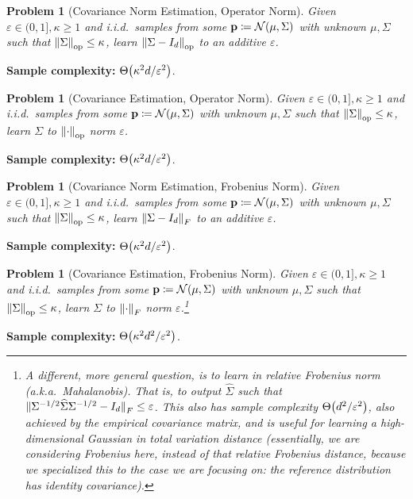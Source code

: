 \documentclass[10pt]{article}
\newcommand{\dst}{\varepsilon}
\newcommand{\dims}{d}
\newcommand{\p}{\mathbf{p}}
\renewcommand{\eqdef}{\coloneqq}
\theoremstyle{plain}
\newtheorem{problem}[theorem]{Problem}
\begin{document}
\begin{problem}[Covariance Norm Estimation, Operator Norm]
  \label{problem:cov:learn:norm:op}
  Given $\dst \in(0,1], \kappa\geq 1$ and i.i.d.\ samples from some $\p\eqdef\gaussian{\mu}{\Sigma}$ with unknown $\mu,\Sigma$ such that $\lVert\Sigma{\rVert}_{\rm op}\leq \kappa$, learn $\norm{\Sigma - I_\dims}_{\rm op}$ to an additive $\dst$.
\end{problem}
\hfill \textbf{Sample complexity:} $\bigTheta{\kappa^2\dims/\dst^2}$. 

\begin{problem}[Covariance Estimation, Operator Norm]
  \label{problem:cov:learn:op}
  Given $\dst \in(0,1], \kappa\geq 1$ and i.i.d.\ samples from some $\p\eqdef\gaussian{\mu}{\Sigma}$ with unknown $\mu,\Sigma$ such that $\lVert\Sigma{\rVert}_{\rm op}\leq \kappa$, learn $\Sigma$ to $\lVert\cdot{\rVert}_{\rm op}$ norm $\dst$.
\end{problem}
\hfill \textbf{Sample complexity:} $\bigTheta{\kappa^2\dims/\dst^2}$. 

\begin{problem}[Covariance Norm Estimation, Frobenius Norm]
  \label{problem:cov:learn:norm:frob}
  Given $\dst \in(0,1], \kappa\geq 1$ and i.i.d.\ samples from some $\p\eqdef\gaussian{\mu}{\Sigma}$ with unknown $\mu,\Sigma$ such that $\lVert\Sigma{\rVert}_{\rm op}\leq \kappa$, learn $\norm{\Sigma-I_\dims}_{F}$ to an additive $\dst$.
\end{problem}
\hfill \textbf{Sample complexity:} $\bigTheta{\kappa^2\dims/\dst^2}$. 

\begin{problem}[Covariance Estimation, Frobenius Norm]
  \label{problem:cov:learn:frob}
  Given $\dst \in(0,1], \kappa\geq 1$ and i.i.d.\ samples from some $\p\eqdef\gaussian{\mu}{\Sigma}$ with unknown $\mu,\Sigma$ such that $\lVert\Sigma{\rVert}_{\rm op}\leq \kappa$, learn $\Sigma$ to $\lVert\cdot{\rVert}_{F}$ norm $\dst$.\footnote{A different, more general question, is to learn in \emph{relative} Frobenius norm (a.k.a.\ Mahalanobis). That is, to output $\widehat{\Sigma}$ such that $\norm{\Sigma^{-1/2}\widehat{\Sigma}\Sigma^{-1/2}-I_\dims}_F \leq \dst$. This also has sample complexity $\bigTheta{\dims^2/\dst^2}$, also achieved by the empirical covariance matrix, and is useful for learning a high-dimensional Gaussian in total variation distance (essentially, we are considering Frobenius here, instead of that relative Frobenius distance, because we specialized this to the case we are focusing on: the reference distribution has identity covariance).}
\end{problem}
\hfill \textbf{Sample complexity:} $\bigTheta{\kappa^2\dims^2/\dst^2}$. 
\end{document}
